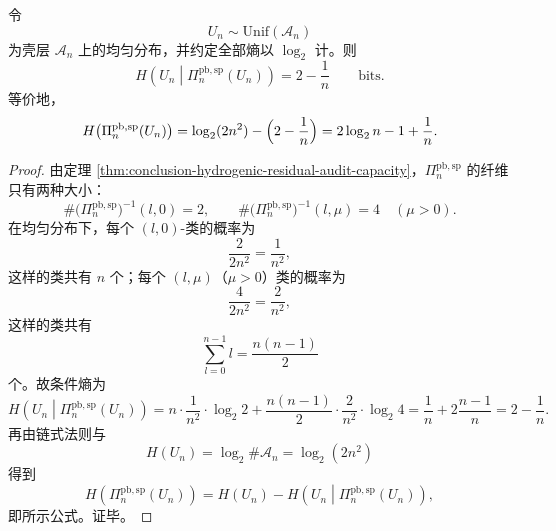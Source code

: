 \begin{theorem}[相位盲规范投影的平均残余预算]\label{thm:conclusion-hydrogenic-phaseblind-average-residual-bits}
令
\[
U_n\sim \mathrm{Unif}(\mathcal A_n)
\]
为壳层 \(\mathcal A_n\) 上的均匀分布，并约定全部熵以 \(\log_2\) 计。则
\[
H\!\left(U_n\middle|\Pi_n^{\mathrm{pb,sp}}(U_n)\right)
=
2-\frac1n
\qquad\text{bits}.
\]
等价地，
\[
H\!\left(\Pi_n^{\mathrm{pb,sp}}(U_n)\right)
=
\log_2(2n^2)-\Bigl(2-\frac1n\Bigr)
=
2\log_2 n-1+\frac1n.
\]
\end{theorem}
\begin{proof}
由定理 \ref{thm:conclusion-hydrogenic-residual-audit-capacity}，\(\Pi_n^{\mathrm{pb,sp}}\) 的纤维只有两种大小：
\[
\#\bigl(\Pi_n^{\mathrm{pb,sp}}\bigr)^{-1}(l,0)=2,
\qquad
\#\bigl(\Pi_n^{\mathrm{pb,sp}}\bigr)^{-1}(l,\mu)=4
\quad
(\mu>0).
\]
在均匀分布下，每个 \((l,0)\)-类的概率为
\[
\frac{2}{2n^2}=\frac1{n^2},
\]
这样的类共有 \(n\) 个；每个 \((l,\mu)\)（\(\mu>0\)）类的概率为
\[
\frac{4}{2n^2}=\frac{2}{n^2},
\]
这样的类共有
\[
\sum_{l=0}^{n-1}l=\frac{n(n-1)}2
\]
个。故条件熵为
\[
H\!\left(U_n\middle|\Pi_n^{\mathrm{pb,sp}}(U_n)\right)
=
n\cdot \frac1{n^2}\cdot \log_2 2
+
\frac{n(n-1)}2\cdot \frac{2}{n^2}\cdot \log_2 4
=
\frac1n+2\frac{n-1}{n}
=
2-\frac1n.
\]
再由链式法则与
\[
H(U_n)=\log_2\#\mathcal A_n=\log_2(2n^2)
\]
得到
\[
H\!\left(\Pi_n^{\mathrm{pb,sp}}(U_n)\right)
=
H(U_n)-H\!\left(U_n\middle|\Pi_n^{\mathrm{pb,sp}}(U_n)\right),
\]
即所示公式。证毕。
\end{proof}


